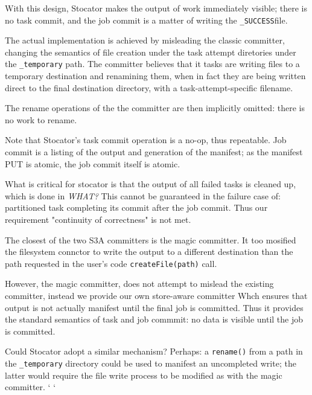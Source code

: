 \documentclass[conference]{IEEEtran}
\newcommand{\SUCCESS}{\texttt{\_SUCCESS}}
\begin{document}
With this design, Stocator makes the output of work immediately visible;
there is no task commit, and the job commit is a matter of writing
the \SUCCESS file.

The actual implementation is achieved by misleading the classic committer,
changing the semantics of file creation under the task attempt diretories
under the \texttt{\_temporary} path.
The committer believes that it tasks are
 writing files to a temporary destination and renamining them, when
in fact they are being written direct to the final destination directory,
with a task-attempt-specific filename.

The rename operations of the the committer are then implicitly omitted:
there is no work to rename.

Note that Stocator's task commit operation is a no-op, thus repeatable.
Job commit is a listing of the output and generation of the manifest;
as the manifest PUT is atomic, the job commit itself is atomic.

What is critical for stocator is that the output of all failed tasks
is cleaned up, which is done in \emph{WHAT?}
This cannot be guaranteed in the failure case of: partitioned task
completing its commit after the job commit.
Thus our requirement "continuity of correctness" is not met.

The closest of the two S3A committers is the magic committer.
It too mosified the filesystem connctor to write the output to a
different destination than the path requested
in the user's code \texttt{createFile(path)} call.

However, the magic committer, does not attempt to mislead the existing committer,
instead we provide our own store-aware committer
Whch ensures that output is not actually manifest until
the final job is committed.
Thus it provides the standard semantics of task and job commmit: no data is
visible until the job is committed.

Could Stocator adopt a similar mechanism?
Perhaps: a \texttt{rename()} from a path in the \texttt{_temporary} directory
could be used to manifest an uncompleted write;
the latter would require the file write process to be modified as with
the magic committer.
`%
`
\end{document}
